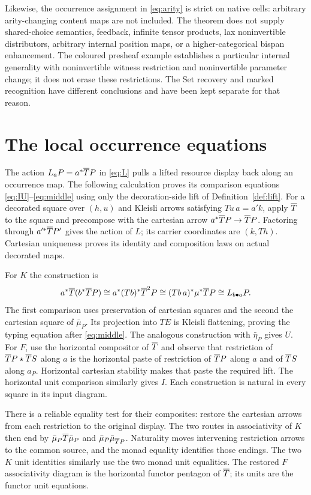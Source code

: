 \documentclass[11pt]{article}
\numberwithin{equation}{section}
\theoremstyle{definition}\newtheorem{definition}[theorem]{Definition}
\begin{document}
Likewise, the occurrence assignment in \eqref{eq:arity} is strict on
native cells: arbitrary arity-changing content maps are not included.
The theorem does not supply shared-choice semantics, feedback, infinite
tensor products, lax noninvertible distributors, arbitrary internal
position maps, or a higher-categorical bispan enhancement. The coloured
presheaf example establishes a particular internal generality with
noninvertible witness restriction and noninvertible parameter change;
it does not erase these restrictions. The Set recovery and marked
recognition have different conclusions and have been kept separate
for that reason.

\section{The local occurrence equations}\label{app:local}
The action $L_aP=a^*\overline T P$ in \eqref{eq:L} pulls a lifted resource display
back along an occurrence map. The following calculation proves its
comparison equations \eqref{eq:IU}--\eqref{eq:middle} using only the
decoration-side lift of Definition~\ref{def:lift}. For a decorated square over $(h,u)$ and
Kleisli arrows satisfying $Tu\,a=a'k$, apply $\overline T$ to the square and
precompose with the cartesian arrow $a^*\overline T P\to\overline T P$. Factoring
through $a'^*\overline T P'$ gives the action of $L$; its carrier coordinates
are $(k,Th)$. Cartesian uniqueness proves its identity and composition
laws on actual decorated maps.

For $K$ the construction is
\[
 a^*\overline T(b^*\overline T P)
 \cong a^*(Tb)^*\overline T^2P
 \cong (Tb\,a)^*\mu^*\overline T P
 \cong L_{b\bullet a}P.
\]
The first comparison uses preservation of cartesian squares and the
second the cartesian square of $\bar\mu_P$. Its projection into $TE$
is Kleisli flattening, proving the typing equation after
\eqref{eq:middle}. The analogous construction with $\bar\eta_P$ gives
$U$. For $F$, use the horizontal compositor of $\overline T$ and observe that
restriction of $\overline T P\mathbin{\star}\overline T S$ along $a$ is the horizontal paste of
restriction of $\overline T P$ along $a$ and of $\overline T S$ along $a_P$.
Horizontal cartesian stability makes that paste the required lift.
The horizontal unit comparison similarly gives $I$. Each construction
is natural in every square in its input diagram.

There is a reliable equality test for their composites: restore the
cartesian arrows from each restriction to the original display. The two
routes in associativity of $K$ then end by
$\bar\mu_P\overline T\bar\mu_P$ and $\bar\mu_P\bar\mu_{\overline T P}$.
Naturality moves intervening restriction arrows to the common source,
and the monad equality identifies those endings. The two $K$ unit
identities similarly use the two monad unit equalities. The restored
$F$ associativity diagram is the horizontal functor pentagon of $\overline T$;
its units are the functor unit equations.
\end{document}

